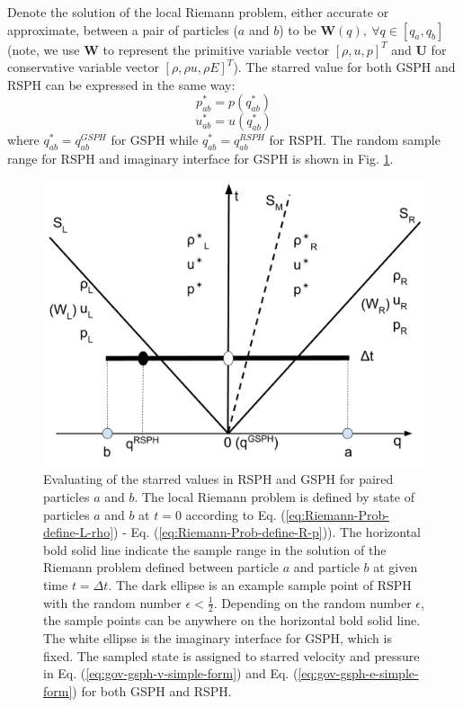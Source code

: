Denote the solution of the local Riemann problem, either accurate or approximate, between a pair of particles ($a$ and $b$) to be $\textbf{W} (q), \  \forall q \in [q_a, q_b]$ (note, we use $\textbf{W}$ to represent the primitive variable vector $[\rho, u, p]^T$ and $\textbf{U}$ for conservative variable vector  $[\rho, \rho u, \rho E]^T$). The starred value for both GSPH and RSPH can be expressed in the same way:
\begin{equation}
p_{ab}^{\ast} = p \left(q_{ab}^{\ast} \right)
\label{eq:RSPH-Random-Pick-p}
\end{equation}
\begin{equation}
u_{ab}^{\ast} = u \left(q_{ab}^{\ast} \right)
\label{eq:RSPH-Random-Pick-u}
\end{equation}
where $q_{ab}^{\ast}=q_{ab}^{GSPH}$ for GSPH while $q_{ab}^{\ast}=q_{ab}^{RSPH}$ for RSPH. The random sample range for RSPH and imaginary interface for GSPH is shown in Fig. \ref{fig:pick-up-state-GSPH-RSPH}.
\begin{figure}[H]
    \center
	\includegraphics[width=0.5 \textwidth]{Chapter-4/Figures/RSPH-GSPH}
    \caption{Evaluating of the starred values in RSPH and GSPH for paired particles $a$ and $b$. The local Riemann problem is defined by state of particles $a$ and $b$ at $t=0$ according to Eq. (\ref{eq:Riemann-Prob-define-L-rho}) - Eq. (\ref{eq:Riemann-Prob-define-R-p})). The horizontal bold solid line indicate the sample range in the solution of the Riemann problem defined between particle $a$ and particle $b$ at given time $t=\Delta t$. The dark ellipse is an example sample point of RSPH with the random number $\epsilon < \frac{1}{2}$. Depending on the random number $\epsilon$, the sample points can be anywhere on the horizontal bold solid line. The white ellipse is the imaginary interface for GSPH, which is fixed. The sampled state is assigned to starred velocity and pressure in Eq. (\ref{eq:gov-gsph-v-simple-form}) and Eq. (\ref{eq:gov-gsph-e-simple-form}) for both GSPH and RSPH.}
    \label{fig:pick-up-state-GSPH-RSPH}
\end{figure}

